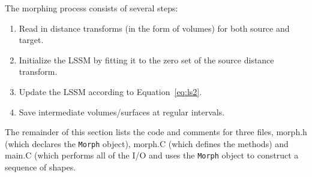 The morphing process consists of several steps:
\begin{enumerate}
\item Read in distance transforms (in the form of volumes) for both
source and target.
\item Initialize the LSSM by fitting it to the zero set of the source
distance transform.
\item Update the LSSM according to Equation~\ref{eq:ls2}.
\item Save intermediate volumes/surfaces at regular intervals.
\end{enumerate}

The remainder of this section lists the code and comments for three
files, morph.h (which declares the {\tt Morph} object), morph.C (which
defines the methods) and main.C (which performs all of the I/O and uses
the {\tt Morph} object to construct a sequence of shapes.

